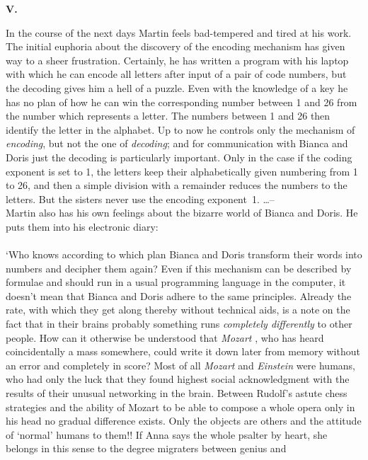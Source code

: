 \begin{center} 
{\bf V.} 
\end{center} 
In the course of the next days Martin feels bad-tempered and tired at his work. 
The initial euphoria about the discovery of the encoding mechanism has given way to a sheer frustration. 
Certainly, he has written a program with his laptop with which he can encode all letters after input of a 
pair of code numbers, but the decoding gives him a hell of a puzzle. 
Even with the knowledge of a key he has no plan of how he can win the corresponding number between 1 and 26 
from the number which represents a letter. The numbers between 1 and 26 then identify the letter in the alphabet.
Up to now he controls only the mechanism of {\em encoding\/}, but not the one of {\em decoding\/}; and for 
communication with Bianca and Doris just the decoding is particularly important. 
Only in the case if the coding exponent is set to 1, the letters keep their alphabetically given numbering from 
1 to 26, and then a simple division with a remainder reduces the numbers to the letters. 
But the sisters never use the encoding exponent~1. \dots -- \\ 
Martin also has his own feelings about the bizarre world of Bianca and Doris. 
He puts them into his electronic diary: \\ \\ 
`Who knows according to which plan Bianca and Doris transform their words into numbers and decipher them again?
Even if this mechanism can be described by formulae and should run in a usual programming language in the 
computer, it doesn't mean that Bianca and Doris adhere to the same principles. 
Already the rate, with which they get along thereby without technical aids, is a note on the fact that in their
brains probably something runs {\em completely differently \/} to other people. 
How can it otherwise be understood that {\em Mozart \/}, who has heard coincidentally a mass somewhere, could 
write it down later from memory without an error and completely in score? 
Most of all {\em Mozart \/} and {\em Einstein \/} were humans, who had only the luck that they found highest 
social acknowledgment with the results of their unusual networking in the brain. 
Between Rudolf's astute chess strategies and the ability of Mozart to be able to compose a whole opera only 
in his head no gradual difference exists. 
Only the objects are others and the attitude of `normal' humans to them!! 
If Anna says the whole psalter by heart, she belongs in this sense to the degree migraters between genius and 
